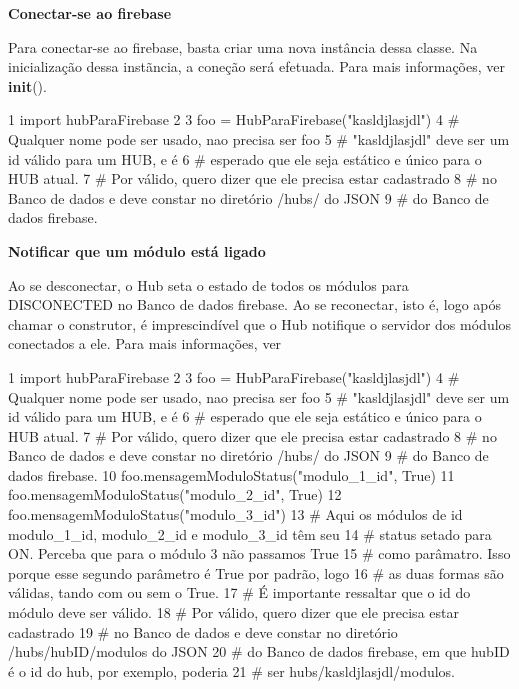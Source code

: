 {\bfseries Conectar-\/se ao firebase}

Para conectar-\/se ao firebase, basta criar uma nova instância dessa classe. Na inicialização dessa instãncia, a coneção será efetuada. Para mais informações, ver {\bfseries init}().


\begin{DoxyCode}
1 \textcolor{keyword}{import} hubParaFirebase
2 
3 foo = HubParaFirebase(\textcolor{stringliteral}{"kasldjlasjdl"})
4 \textcolor{comment}{#  Qualquer nome pode ser usado, nao precisa ser foo}
5 \textcolor{comment}{#  "kasldjlasjdl" deve ser um id válido para um HUB, e é}
6 \textcolor{comment}{# esperado que ele seja estático e único para o HUB atual.}
7 \textcolor{comment}{#  Por válido, quero dizer que ele precisa estar cadastrado}
8 \textcolor{comment}{# no Banco de dados e deve constar no diretório /hubs/ do JSON}
9 \textcolor{comment}{# do Banco de dados firebase.}
\end{DoxyCode}


{\bfseries Notificar que um módulo está ligado}

Ao se desconectar, o Hub seta o estado de todos os módulos para D\+I\+S\+C\+O\+N\+E\+C\+T\+ED no Banco de dados firebase. Ao se reconectar, isto é, logo após chamar o construtor, é imprescindível que o Hub notifique o servidor dos módulos conectados a ele. Para mais informações, ver


\begin{DoxyCode}
1 \textcolor{keyword}{import} hubParaFirebase
2 
3 foo = HubParaFirebase(\textcolor{stringliteral}{"kasldjlasjdl"})
4 \textcolor{comment}{#  Qualquer nome pode ser usado, nao precisa ser foo}
5 \textcolor{comment}{#  "kasldjlasjdl" deve ser um id válido para um HUB, e é}
6 \textcolor{comment}{# esperado que ele seja estático e único para o HUB atual.}
7 \textcolor{comment}{#  Por válido, quero dizer que ele precisa estar cadastrado}
8 \textcolor{comment}{# no Banco de dados e deve constar no diretório /hubs/ do JSON}
9 \textcolor{comment}{# do Banco de dados firebase.}
10 foo.mensagemModuloStatus(\textcolor{stringliteral}{"modulo\_1\_id"}, \textcolor{keyword}{True})
11 foo.mensagemModuloStatus(\textcolor{stringliteral}{"modulo\_2\_id"}, \textcolor{keyword}{True})
12 foo.mensagemModuloStatus(\textcolor{stringliteral}{"modulo\_3\_id"})
13 \textcolor{comment}{#  Aqui os módulos de id modulo\_1\_id, modulo\_2\_id e modulo\_3\_id têm seu}
14 \textcolor{comment}{# status setado para ON. Perceba que para o módulo 3 não passamos True}
15 \textcolor{comment}{# como parâmatro. Isso porque esse segundo parâmetro é True por padrão, logo}
16 \textcolor{comment}{# as duas formas são válidas, tando com ou sem o True.}
17 \textcolor{comment}{#  É importante ressaltar que o id do módulo deve ser válido.}
18 \textcolor{comment}{#  Por válido, quero dizer que ele precisa estar cadastrado}
19 \textcolor{comment}{# no Banco de dados e deve constar no diretório /hubs/hubID/modulos do JSON}
20 \textcolor{comment}{# do Banco de dados firebase, em que hubID é o id do hub, por exemplo, poderia}
21 \textcolor{comment}{# ser hubs/kasldjlasjdl/modulos.}
\end{DoxyCode}


